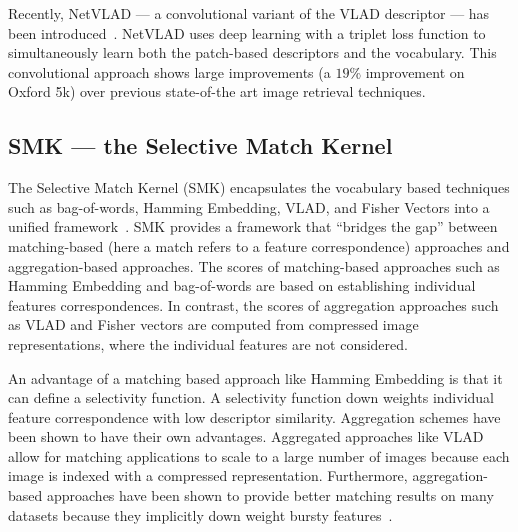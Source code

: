         Recently, NetVLAD --- a convolutional variant of the VLAD
          descriptor --- has been
          introduced~\cite{arandjelovic_netvlad_2015,radenovic_cnn_2016}.
        NetVLAD uses deep learning with a triplet loss function to
          simultaneously learn both the patch-based descriptors and the
          vocabulary.
        This convolutional approach shows large improvements (a
          $19\percent$ improvement on Oxford 5k) over previous
          state-of-the art image retrieval techniques.

    \subsection{SMK --- the Selective Match Kernel}\label{sec:smk}
        The Selective Match Kernel (SMK) encapsulates the vocabulary
          based techniques such as bag-of-words, Hamming Embedding, VLAD,
          and Fisher Vectors into a unified
          framework~\cite{bo_efficient_2009, tolias_aggregate_2013,
          tolias_image_2015, jegou_triangulation_2014}.
        SMK provides a framework that ``bridges the gap'' between
          matching-based (here a match refers to a feature
          correspondence) approaches and aggregation-based approaches.
        The scores of matching-based approaches such as Hamming
          Embedding and bag-of-words are based on establishing individual
          features correspondences.
        In contrast, the scores of aggregation approaches such as VLAD
          and Fisher vectors are computed from compressed image
          representations, where the individual features are not
          considered.

        An advantage of a matching based approach like Hamming
          Embedding is that it can define a selectivity function.
        A selectivity function down weights individual feature
          correspondence with low descriptor similarity.
        Aggregation schemes have been shown to have their own
          advantages.
        Aggregated approaches like VLAD allow for matching applications
          to scale to a large number of images because each image is
          indexed with a compressed representation.
        Furthermore, aggregation-based approaches have been shown to
          provide better matching results on many datasets because they
          implicitly down weight bursty
          features~\cite{tolias_aggregate_2013, tolias_image_2015}.

